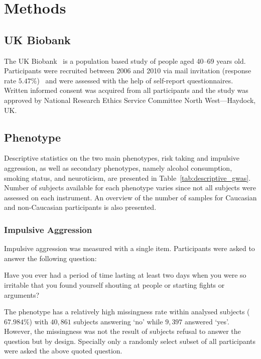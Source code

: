 \section{Methods}
\label{sec:methods_assoc}

\subsection{UK Biobank}
\label{sub:uk_biobank}
The UK Biobank~\cite{Allen2014} is a population based study of people aged 40--69 years old. 
Participants were recruited between 2006 and 2010 via mail invitation (response rate $5.47\%$)~\cite{Sudlow2015} and were assessed with the help of self-report questionnaires.
Written informed consent was acquired from all participants and the study was approved by National Research Ethics Service Committee North West---Haydock, UK\@.

\subsection{Phenotype}
\label{sub:phenotype}

Descriptive statistics on the two main phenotypes, risk taking and impulsive aggression,
as well as secondary phenotypes, namely alcohol consumption, smoking status, and neuroticism, are presented in Table~\ref{tab:descriptive_gwas}.  
Number of subjects available for each phenotype varies since not all subjects were assessed on each instrument.
An overview of the number of samples for Caucasian and non-Caucasian participants is also presented.

\subsubsection{Impulsive Aggression}
\label{ssub:impulsive_aggression}
Impulsive aggression was measured with a single item.
Participants were asked to answer the following question:
\begin{displayquote}
  Have you ever had a period of time lasting at least two days when you were so irritable that you found yourself shouting at people or starting fights or arguments?
\end{displayquote}
The phenotype has a relatively high missingness rate within analysed subjects ($67.984\%$) with $40,861$ subjects answering `no' while $9,397$ answered `yes'.
However, the missingness was not the result of subjects refusal to answer the question but by design.
Specially only a randomly select subset of all participants were asked the above quoted question.

